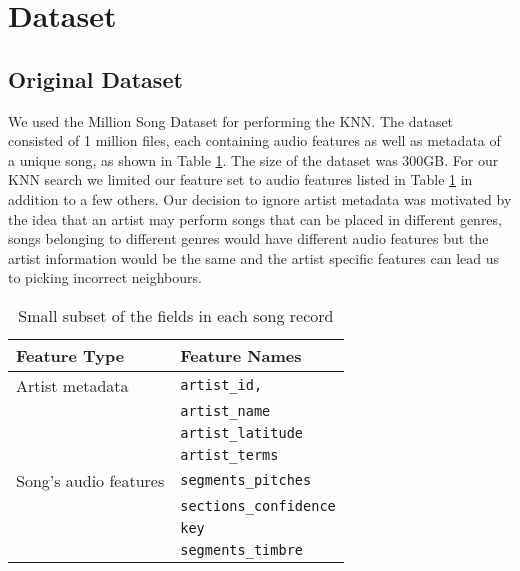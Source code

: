 \section{Dataset}
\label{sec:dataset}
\subsection{Original Dataset}
\label{subsec: meth_orig_dataset}
We used the Million Song Dataset \cite{msd01} for performing the KNN. 
The dataset consisted of 1 million files, each containing audio features as well as metadata of a unique song, as shown in Table \ref{table:field_msd_rec}. 
The size of the dataset was 300GB. 
For our KNN search we limited our feature set to audio features listed in Table \ref{table:field_msd_rec} in addition to a few others. 
Our decision to ignore artist metadata was motivated by the idea that an artist may perform songs that can be placed in different genres, songs belonging to different genres would have different audio features but the artist information would be the same and the artist specific features can lead us to picking incorrect neighbours.
\begin{table}
\begin{center}
\begin{tabular}{| l | l |}
\hline
\textbf{Feature Type} & \textbf{Feature Names} \\
\hline
Artist metadata & \texttt{artist\_id,} \\
 & \texttt{artist\_name}\\
 & \texttt{artist\_latitude}\\
 & \texttt{artist\_terms}\\
\hline
Song's audio features & \texttt{segments\_pitches}\\
 & \texttt{sections\_confidence}\\
 & \texttt{key}\\
 & \texttt{segments\_timbre}\\
\hline
\end{tabular}
\caption{Small subset of the fields in each song record}
\label{table:field_msd_rec}
\end{center}
\end{table}

